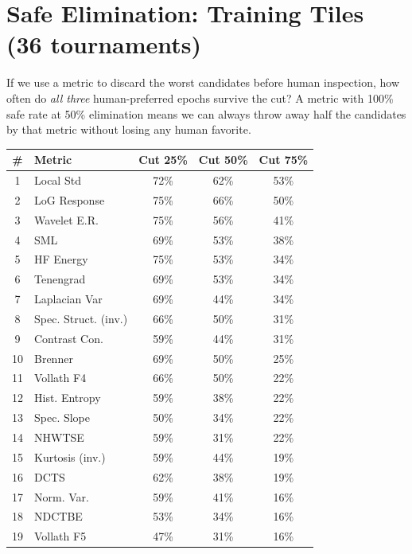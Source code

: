 \documentclass[11pt]{article}
\begin{document}
\section{Safe Elimination: Training Tiles (36 tournaments)}

If we use a metric to discard the worst candidates before human inspection, 
how often do \emph{all three} human-preferred epochs survive the cut? 
A metric with 100\% safe rate at 50\% elimination means we can always 
throw away half the candidates by that metric without losing any human favorite.

\vspace{0.5em}
\begin{center}
\small
\begin{tabular}{clccc}
\toprule
\textbf{\#} & \textbf{Metric} & \textbf{Cut 25\%} & \textbf{Cut 50\%} & \textbf{Cut 75\%} \\
\midrule
\rowcolor{toprow} 1 & Local Std & 72\% & 62\% & 53\% \\
\rowcolor{toprow} 2 & LoG Response & 75\% & 66\% & 50\% \\
\rowcolor{midrow} 3 & Wavelet E.R. & 75\% & 56\% & 41\% \\
\rowcolor{midrow} 4 & SML & 69\% & 53\% & 38\% \\
\rowcolor{midrow} 5 & HF Energy & 75\% & 53\% & 34\% \\
\rowcolor{midrow} 6 & Tenengrad & 69\% & 53\% & 34\% \\
\rowcolor{midrow} 7 & Laplacian Var & 69\% & 44\% & 34\% \\
\rowcolor{midrow} 8 & Spec. Struct. (inv.) & 66\% & 50\% & 31\% \\
\rowcolor{midrow} 9 & Contrast Con. & 59\% & 44\% & 31\% \\
10 & Brenner & 69\% & 50\% & 25\% \\
11 & Vollath F4 & 66\% & 50\% & 22\% \\
12 & Hist. Entropy & 59\% & 38\% & 22\% \\
13 & Spec. Slope & 50\% & 34\% & 22\% \\
14 & NHWTSE & 59\% & 31\% & 22\% \\
15 & Kurtosis (inv.) & 59\% & 44\% & 19\% \\
16 & DCTS & 62\% & 38\% & 19\% \\
17 & Norm. Var. & 59\% & 41\% & 16\% \\
18 & NDCTBE & 53\% & 34\% & 16\% \\
19 & Vollath F5 & 47\% & 31\% & 16\% \\
\bottomrule
\end{tabular}
\end{center}
\end{document}
